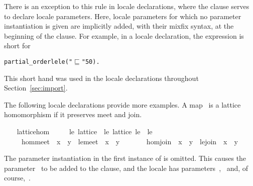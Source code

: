 \begin{isabellebody}
\begin{isamarkuptext}
  There is an exception to this rule in locale declarations, where the
   clause serves to declare locale parameters.  Here,
  locale parameters for which no parameter instantiation is given are
  implicitly added, with their mixfix syntax, at the beginning of the
   clause.  For example, in a locale declaration, the
  expression  is short for
\begin{small}
\begin{alltt}
  partial_order le  le ( "\(\sqsubseteq\)" 50)\textrm{.}
\end{alltt}
\end{small}
  This short hand was used in the locale declarations throughout
  Section~\ref{sec:import}.%
\end{isamarkuptext}%
\isamarkuptrue%
%
\begin{isamarkuptext}%
The following locale declarations provide more examples.  A
  map~\isa{{\isasymphi}} is a lattice homomorphism if it preserves meet and
  join.%
\end{isamarkuptext}%
\isamarkuptrue%
\ \ \isamarkupfalse%
\ lattice{\isacharunderscore}hom\ {\isacharequal}\isanewline
\ \ \ \ le{\isacharcolon}\ lattice\ {\isacharplus}\ le{\isacharprime}{\isacharcolon}\ lattice\ le{\isacharprime}\ \ le{\isacharprime}\ {\isacharparenleft}\ {\isachardoublequoteopen}{\isasympreceq}{\isachardoublequoteclose}\ {}{}{\isacharparenright}\ {\isacharplus}\isanewline
\ \ \ \ \ {\isasymphi}\isanewline
\ \ \ \ \ hom{\isacharunderscore}meet{\isacharcolon}\ {\isachardoublequoteopen}{\isasymphi}\ {\isacharparenleft}x\ {\isasymsqinter}\ y{\isacharparenright}\ {\isacharequal}\ le{\isacharprime}{\isachardot}meet\ {\isacharparenleft}{\isasymphi}\ x{\isacharparenright}\ {\isacharparenleft}{\isasymphi}\ y{\isacharparenright}{\isachardoublequoteclose}\isanewline
\ \ \ \ \ \ \ hom{\isacharunderscore}join{\isacharcolon}\ {\isachardoublequoteopen}{\isasymphi}\ {\isacharparenleft}x\ {\isasymsqunion}\ y{\isacharparenright}\ {\isacharequal}\ le{\isacharprime}{\isachardot}join\ {\isacharparenleft}{\isasymphi}\ x{\isacharparenright}\ {\isacharparenleft}{\isasymphi}\ y{\isacharparenright}{\isachardoublequoteclose}%
\begin{isamarkuptext}%
The parameter instantiation in the first instance of  is omitted.  This causes the parameter~ to be
  added to the  clause, and the locale has
  parameters~,~ and, of course,~\isa{{\isasymphi}}.


\end{isamarkuptext}
\end{isabellebody}
